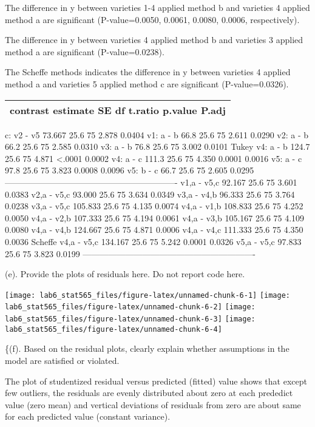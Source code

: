 \documentclass[]{article}
\begin{document}
The difference in y between varieties 1-4 applied method b and varieties
4 applied method a are significant (P-value=0.0050, 0.0061, 0.0080,
0.0006, respectively).

The difference in y between varieties 4 applied method b and varieties 3
applied method a are significant (P-value=0.0238).

The Scheffe methods indicates the difference in y between varieties 4
applied method a and varieties 5 applied method c are significant
(P-value=0.0326).

\begin{longtable}[]{@{}l@{}}
\toprule
\endhead
contrast estimate SE df t.ratio p.value P.adj\tabularnewline
\bottomrule
\end{longtable}

c: v2 - v5 73.667 25.6 75 2.878 0.0404 v1: a - b 66.8 25.6 75 2.611
0.0290 v2: a - b 66.2 25.6 75 2.585 0.0310 v3: a - b 76.8 25.6 75 3.002
0.0101 Tukey v4: a - b 124.7 25.6 75 4.871 \textless{}.0001 0.0002 v4: a
- c 111.3 25.6 75 4.350 0.0001 0.0016 v5: a - c 97.8 25.6 75 3.823
0.0008 0.0096 v5: b - c 66.7 25.6 75 2.605 0.0295
------------------------------------------------------------- v1,a -
v5,c 92.167 25.6 75 3.601 0.0383 v2,a - v5,c 93.000 25.6 75 3.634 0.0349
v3,a - v4,b 96.333 25.6 75 3.764 0.0238 v3,a - v5,c 105.833 25.6 75
4.135 0.0074 v4,a - v1,b 108.833 25.6 75 4.252 0.0050 v4,a - v2,b
107.333 25.6 75 4.194 0.0061 v4,a - v3,b 105.167 25.6 75 4.109 0.0080
v4,a - v4,b 124.667 25.6 75 4.871 0.0006 v4,a - v4,c 111.333 25.6 75
4.350 0.0036 Scheffe v4,a - v5,c 134.167 25.6 75 5.242 0.0001 0.0326
v5,a - v5,c 97.833 25.6 75 3.823 0.0199
-------------------------------------------------------------

(e).
\textcolor[rgb]{0.5,0.5,0.5}{Provide the plots of residuals here. Do not report code here.}

\texttt{[image: lab6\_stat565\_files/figure-latex/unnamed-chunk-6-1]}
\texttt{[image: lab6\_stat565\_files/figure-latex/unnamed-chunk-6-2]}
\texttt{[image: lab6\_stat565\_files/figure-latex/unnamed-chunk-6-3]}
\texttt{[image: lab6\_stat565\_files/figure-latex/unnamed-chunk-6-4]}

\{(f).
\textcolor[rgb]{0.5,0.5,0.5}{Based on the residual plots, clearly explain whether assumptions in the model are satisfied or violated.}

The plot of studentized residual versus predicted (fitted) value shows
that except few outliers, the residuals are evenly distributed about
zero at each prededict value (zero mean) and vertical deviations of
residuals from zero are about same for each predicted value (constant
variance).
\end{document}
